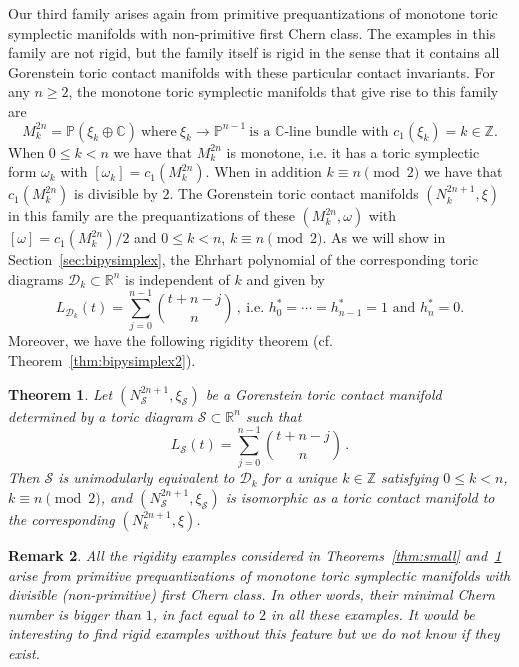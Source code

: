 \documentclass[a4paper,11pt,reqno]{amsart}
\newcommand{\R}{\mathbb R}
\newcommand{\Z}{\mathbb Z}
\newcommand{\C}{\mathbb C}
\newcommand{\CP}{\mathbb P}
\newcommand{\Dd}{{\mathcal D}}
\newcommand{\Ss}{{\mathcal S}}
\newtheorem{theorem}{Theorem}[section]
\newtheorem{remark}[theorem]{Remark}
\begin{document}
Our third family arises again from primitive prequantizations of monotone toric symplectic manifolds with
non-primitive first Chern class. The examples in this family are not rigid, but the family itself is rigid in the
sense that it contains all Gorenstein toric contact manifolds with these particular contact invariants. For 
any $n\geq 2$, the monotone toric symplectic manifolds that give rise to this family are
\[
M^{2n}_k = \CP (\xi_k \oplus \C) \ \text{where}\ \xi_k \to \CP^{n-1} \ \text{is a $\C$-line bundle
with $c_1 (\xi_k) = k \in \Z$.}
\]
When $0\leq k < n$ we have that $M^{2n}_k$ is monotone, i.e. it has a toric symplectic form $\omega_k$ with
$[\omega_k] = c_1 (M_k^{2n})$. When in addition $k \equiv n \pmod 2$ we have 
that $c_1 (M_k^{2n})$ is divisible by $2$. The Gorenstein toric contact manifolds $(N^{2n+1}_k, \xi)$ 
in this family are the prequantizations of these $(M^{2n}_k, \omega)$ with 
$[\omega] = c_1 (M_k^{2n}) /2$ and $0\leq k < n$, $k \equiv n \pmod 2$. As we will show in 
Section~\ref{sec:bipysimplex}, the Ehrhart polynomial of the corresponding toric diagrams $\Dd_k \subset \R^n$ 
is independent of $k$ and given by
\[
L_{\Dd_k} (t) = \sum_{j=0}^{n-1} \binom{t+n-j}{n}\,,\ \text{i.e. $h^\ast_0 = \cdots = h^\ast_{n-1}=1$ and $h^\ast_n = 0$.}
\]
Moreover, we have the following rigidity theorem (cf. Theorem~\ref{thm:bipysimplex2}).
\begin{theorem} \label{thm:bipysimplex1}
Let $(N^{2n+1}_\Ss, \xi_\Ss)$ be a Gorenstein toric contact manifold determined by a toric diagram $\Ss\subset\R^n$
such that
\[
L_{\Ss} (t) = \sum_{j=0}^{n-1} \binom{t+n-j}{n}\,.
\]
Then $\Ss$ is unimodularly equivalent to $\Dd_k$ for a unique $k\in\Z$ satisfying $0\leq k < n$, $k \equiv n \pmod 2$,
and $(N^{2n+1}_\Ss, \xi_\Ss)$ is isomorphic as a toric contact manifold to the corresponding $(N^{2n+1}_k, \xi)$.
\end{theorem}

\begin{remark} \label{rem:rem}
All the rigidity examples considered in Theorems~\ref{thm:small} and~\ref{thm:bipysimplex1} arise from primitive
prequantizations of monotone toric symplectic manifolds with divisible (non-primitive) first Chern class. In other 
words, their minimal Chern number is bigger than $1$, in fact equal to $2$ in all these examples. It would be 
interesting to find rigid examples without this feature but we do not know if they exist.
\end{remark}
\end{document}
